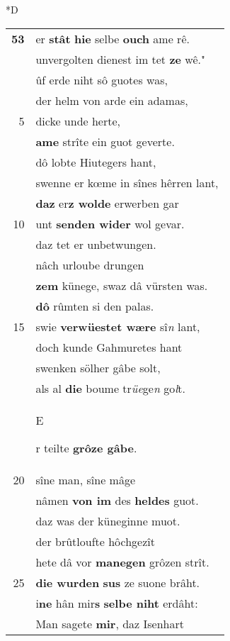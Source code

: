 \documentclass[8pt,a4paper,notitlepage]{article}
\begin{document}
\begin{table}[ht]
\begin{minipage}[t]{0.5\linewidth}
\small
\begin{center}*D
\end{center}
\begin{tabular}{rl}
\textbf{53} & er \textbf{stât} \textbf{hie} selbe \textbf{ouch} ame rê.\\ 
 & unvergolten dienest im tet \textbf{ze} wê."\\ 
 & ûf erde niht sô guotes was,\\ 
 & der helm von arde ein adamas,\\ 
5 & dicke unde herte,\\ 
 & \textbf{ame} strîte ein guot geverte.\\ 
 & dô lobte Hiutegers hant,\\ 
 & swenne er kœme in sînes hêrren lant,\\ 
 & \textbf{daz} er\textbf{z wolde} erwerben gar\\ 
10 & unt \textbf{senden wider} wol gevar.\\ 
 & daz tet er unbetwungen.\\ 
 & nâch urloube drungen\\ 
 & \textbf{zem} künege, swaz dâ vürsten was.\\ 
 & \textbf{dô} rûmten si den palas.\\ 
15 & swie \textbf{verwüestet wære} sî\textit{n} lant,\\ 
 & doch kunde Gahmuretes hant\\ 
 & swenken sölher gâbe solt,\\ 
 & als al \textbf{die} boume tr\textit{üe}ge\textit{n} go\textit{l}t.\\ 
 & \begin{large}E\end{large}r teilte \textbf{grôze gâbe}.\\ 
20 & sîne man, sîne mâge\\ 
 & nâmen \textbf{von im} des \textbf{heldes} guot.\\ 
 & daz was der küneginne muot.\\ 
 & der brûtloufte hôchgezît\\ 
 & hete dâ vor \textbf{manegen} grôzen strît.\\ 
25 & \textbf{die wurden} \textbf{sus} ze suone brâht.\\ 
 & i\textbf{ne} hân mir\textbf{s} \textbf{selbe niht} erdâht:\\ 
 & Man sagete \textbf{mir}, daz Isenhart\\ 

\end{tabular}
\end{minipage}
\end{table}
\end{document}
